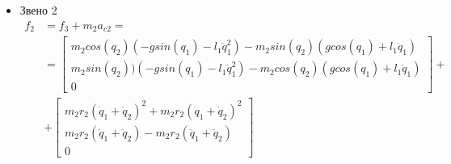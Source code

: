 \documentclass[a4paper,14pt]{extreport}
\begin{document}
\begin{itemize}
	\item Звено 2
\begin{align*}
f_2 &= f_3 + m_2 a_{c2} =\\
&=
\begin{bmatrix}
m_2 cos(q_2) (-g sin(q_1) - l_1 \ddot q_1^2) - m_2 sin(q_2) (g cos(q_1) + l_1 \ddot q_1)\\
m_2 sin(q_2) ) (-g sin(q_1) - l_1 \ddot q_1^2) - m_2 cos(q_2) (g cos(q_1) + l_1 \ddot q_1)\\
0
\end{bmatrix}
+\\
&+
\begin{bmatrix}
m_2 r_2 (\dot q_1 + \dot q_2)^2 + m_2 r_2(\dot q_1 + \dot q_2)^2\\
m_2 r_2 (\ddot q_1 + \ddot q_2) - m_2 r_2(\ddot q_1 + \ddot q_2)\\
0
\end{bmatrix}
\end{align*}	
	


\end{itemize}
\end{document}
